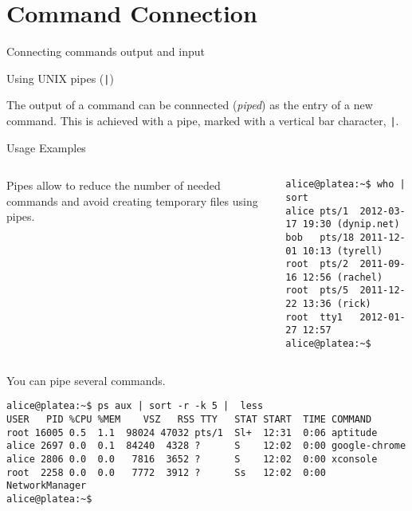 \section{Command Connection}
\begin{frame}[t,fragile]{Connecting commands output and input}

  \vspace{-0.3cm}
  \begin{block}{Using UNIX pipes (\alert{\texttt{|}})}
    {\footnotesize
      The output of a command can be connnected
  (\emph{piped}) as the entry of a new command. This is achieved with
  a pipe, marked with a vertical bar character, \alert{\texttt{|}}.

  Usage Examples
}


\vspace{-0.3cm}
{\scriptsize
  \begin{columns}
      Pipes allow to reduce the number of needed commands and avoid creating temporary files using pipes.
        \begin{lstlisting}
alice@platea:~$ who | sort
alice pts/1  2012-03-17 19:30 (dynip.net)
bob   pts/18 2011-12-01 10:13 (tyrell)
root  pts/2  2011-09-16 12:56 (rachel)
root  pts/5  2011-12-22 13:36 (rick)
root  tty1   2012-01-27 12:57
alice@platea:~$ 
        \end{lstlisting}
    \end{columns}

    You can pipe several commands.

        \begin{lstlisting}
alice@platea:~$ ps aux | sort -r -k 5 |  less
USER   PID %CPU %MEM    VSZ   RSS TTY   STAT START  TIME COMMAND
root 16005 0.5  1.1  98024 47032 pts/1  Sl+  12:31  0:06 aptitude
alice 2697 0.0  0.1  84240  4328 ?      S    12:02  0:00 google-chrome
alice 2806 0.0  0.0   7816  3652 ?      S    12:02  0:00 xconsole 
root  2258 0.0  0.0   7772  3912 ?      Ss   12:02  0:00 NetworkManager
alice@platea:~$ 
        \end{lstlisting}
}
  \end{block}
  
\end{frame}
